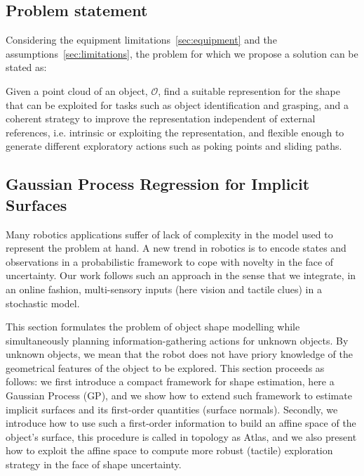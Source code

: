 \subsection{Problem statement}
\label{sec:problem}

Considering the equipment limitations~\ref{sec:equipment} and the assumptions~\ref{sec:limitations}, the problem for which we propose a solution can be stated as:

Given a point cloud of an object, $\mathcal{O}$, find a suitable represention for the shape that can be exploited for tasks such as object identification and grasping, and a coherent strategy to improve the representation independent of external references, i.e. intrinsic or exploiting the representation, and flexible enough to generate different exploratory actions such as poking points and sliding paths.


\subsection{Gaussian Process Regression for Implicit Surfaces}
\label{sec:gpr}

Many robotics applications suffer of lack of complexity in the model used to represent the problem at hand. A new trend in robotics is to encode states and observations in a probabilistic framework to cope with novelty in the face of uncertainty. Our work follows such an approach in the sense that we integrate, in an online fashion, multi-sensory inputs (here vision and tactile clues) in a stochastic model.

This section formulates the problem of object shape modelling while simultaneously planning information-gathering actions for unknown objects. By unknown objects, we mean that the robot does not have priory knowledge of the geometrical features of the object to be explored.  This section proceeds as follows: we first introduce a compact framework for shape estimation, here a Gaussian Process (GP), and we show how to extend such framework to estimate implicit surfaces and its first-order quantities (surface normals). Secondly, we introduce how to use such a first-order information to build an affine space of the object's surface, this procedure is called in topology as Atlas, and we also present how to exploit the affine space to compute more robust (tactile) exploration strategy in the face of shape uncertainty. 


